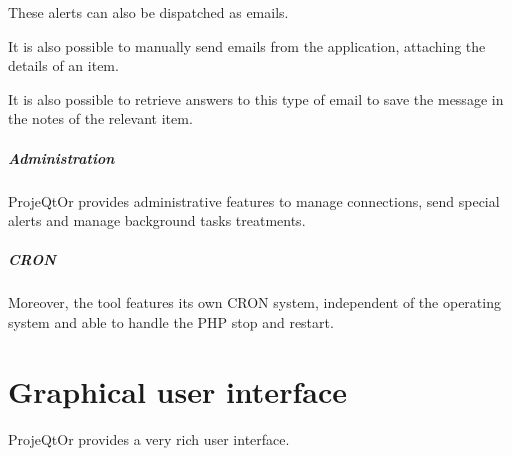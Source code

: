 \documentclass[letterpaper,10pt,english]{sphinxmanual}
\begin{document}
These alerts can also be dispatched as emails.

It is also possible to manually send emails from the application, attaching the details of an item.

It is also possible to retrieve answers to this type of email to save the message in the notes of the relevant item.

\paragraph{Administration}

ProjeQtOr provides administrative features to manage connections, send special alerts and manage background tasks treatments.

\paragraph{CRON}

Moreover, the tool features its own CRON system, independent of the operating system and able to handle the PHP stop and restart.


\chapter{Graphical user interface}
\label{index:graphical-user-interface}
ProjeQtOr provides a very rich user interface.
\end{document}
